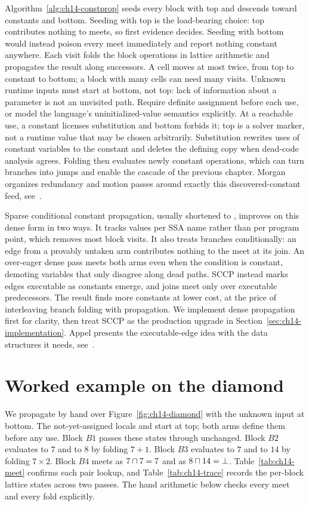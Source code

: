 Algorithm~\ref{alg:ch14-constprop} seeds every block with top and descends toward constants and bottom.
Seeding with top is the load-bearing choice: top contributes nothing to meets, so first evidence decides.
Seeding with bottom would instead poison every meet immediately and report nothing constant anywhere.
Each visit folds the block operations in lattice arithmetic and propagates the result along successors.
A cell moves at most twice, from top to constant to bottom; a block with many cells can need many visits.
Unknown runtime inputs must start at bottom, not top: lack of information about a parameter is not an unvisited path.
Require definite assignment before each use, or model the language's uninitialized-value semantics explicitly.
At a reachable use, a constant licenses substitution and bottom forbids it; top is a solver marker, not a runtime value that may be chosen arbitrarily.
Substitution rewrites uses of constant variables to the constant and deletes the defining copy when dead-code analysis agrees.
Folding then evaluates newly constant operations, which can turn branches into jumps and enable the cascade of the previous chapter.
Morgan organizes redundancy and motion passes around exactly this discovered-constant feed, see~\cite{morgan-1998-optimizing}.

Sparse conditional constant propagation, usually shortened to , improves on this dense form in two ways.
It tracks values per SSA name rather than per program point, which removes most block visits.
It also treats branches conditionally: an edge from a provably untaken arm contributes nothing to the meet at its join.
An over-eager dense pass meets both arms even when the condition is constant, demoting variables that only disagree along dead paths.
SCCP instead marks edges executable as constants emerge, and joins meet only over executable predecessors.
The result finds more constants at lower cost, at the price of interleaving branch folding with propagation.
We implement dense propagation first for clarity, then treat SCCP as the production upgrade in Section~\ref{sec:ch14-implementation}.
Appel presents the executable-edge idea with the data structures it needs, see~\cite{appel-1998-modern}.
\section{Worked example on the diamond}
\label{sec:ch14-worked}

We propagate by hand over Figure~\ref{fig:ch14-diamond} with the unknown input  at bottom.
The not-yet-assigned locals  and  start at top; both arms define them before any use.
Block $B1$ passes these states through unchanged.
Block $B2$ evaluates  to $7$ and  to $8$ by folding $7 + 1$.
Block $B3$ evaluates  to $7$ and  to $14$ by folding $7 \times 2$.
Block $B4$ meets  as $7 \sqcap 7 = 7$ and  as $8 \sqcap 14 = \bot$.
Table~\ref{tab:ch14-meet} confirms each pair lookup, and Table~\ref{tab:ch14-trace} records the per-block lattice states across two passes.
The hand arithmetic below checks every meet and every fold explicitly.


